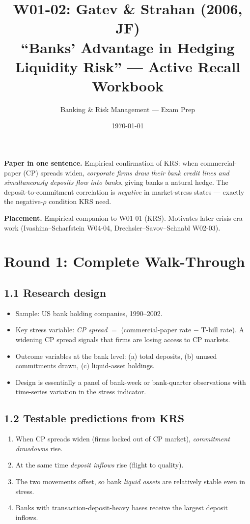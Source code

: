 \documentclass[11pt]{article}
\title{W01-02: Gatev \& Strahan (2006, JF) \\
\large ``Banks' Advantage in Hedging Liquidity Risk'' --- Active Recall Workbook}
\author{Banking \& Risk Management --- Exam Prep}
\date{\today}
\begin{document}
\maketitle

\begin{keybox}
\textbf{Paper in one sentence.} Empirical confirmation of KRS: when commercial-paper (CP) spreads widen, \emph{corporate firms draw their bank credit lines and simultaneously deposits flow into banks}, giving banks a natural hedge. The deposit-to-commitment correlation is \emph{negative} in market-stress states --- exactly the negative-$\rho$ condition KRS need.

\textbf{Placement.} Empirical companion to W01-01 (KRS). Motivates later crisis-era work (Ivashina--Scharfstein W04-04, Drechsler--Savov--Schnabl W02-03).
\end{keybox}

\section*{Round 1: Complete Walk-Through}

\subsection*{1.1 Research design}
\begin{itemize}
\item Sample: US bank holding companies, 1990--2002.
\item Key stress variable: \emph{CP spread} $=$ (commercial-paper rate $-$ T-bill rate). A widening CP spread signals that firms are losing access to CP markets.
\item Outcome variables at the bank level: (a) total deposits, (b) unused commitments drawn, (c) liquid-asset holdings.
\item Design is essentially a panel of bank-week or bank-quarter observations with time-series variation in the stress indicator.
\end{itemize}

\subsection*{1.2 Testable predictions from KRS}
\begin{enumerate}
\item When CP spreads widen (firms locked out of CP market), \emph{commitment drawdowns} rise.
\item At the same time \emph{deposit inflows} rise (flight to quality).
\item The two movements offset, so bank \emph{liquid assets} are relatively stable even in stress.
\item Banks with transaction-deposit-heavy bases receive the largest deposit inflows.
\end{enumerate}
\end{document}
